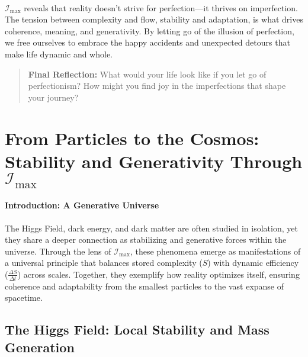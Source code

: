 \documentclass[12pt]{article}
\begin{document}
\paragraph{}
\(\mathcal{I}_{\text{max}}\) reveals that reality doesn’t strive for perfection—it thrives on imperfection. The tension between complexity and flow, stability and adaptation, is what drives coherence, meaning, and generativity. By letting go of the illusion of perfection, we free ourselves to embrace the happy accidents and unexpected detours that make life dynamic and whole.

\begin{quote}
\textbf{Final Reflection:}  
What would your life look like if you let go of perfectionism? How might you find joy in the imperfections that shape your journey?
\end{quote}


\section{From Particles to the Cosmos: Stability and Generativity Through \(\mathcal{I}_{\text{max}}\)}

\paragraph{Introduction: A Generative Universe}
The Higgs Field, dark energy, and dark matter are often studied in isolation, yet they share a deeper connection as stabilizing and generative forces within the universe. Through the lens of \(\mathcal{I}_{\text{max}}\), these phenomena emerge as manifestations of a universal principle that balances stored complexity (\(S\)) with dynamic efficiency (\(\frac{\Delta S}{\Delta t}\)) across scales. Together, they exemplify how reality optimizes itself, ensuring coherence and adaptability from the smallest particles to the vast expanse of spacetime.

\subsection{The Higgs Field: Local Stability and Mass Generation}
\end{document}
